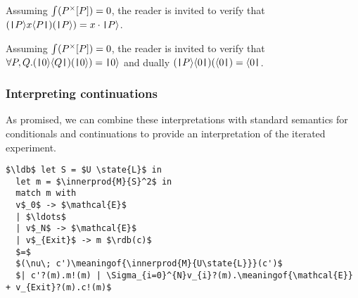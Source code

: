 \begin{remark}
  Assuming $\int (P^{\times}[P]) = 0$, the reader is
  invited to verify that $(\mathsf{\texttt{|}} P \rangle x \langle P \mathsf{\texttt{|}})(\mathsf{\texttt{|}} P \rangle) = x \cdot \mathsf{\texttt{|}} P \rangle$.
\end{remark}




  



\begin{remark}\label{rem:abstract_scalars}
  Assuming $\int (P^{\times}[P]) = 0$, the reader is
  invited to verify that $\forall P,Q. (\mathsf{\texttt{|}} 0 \rangle \langle Q \mathsf{\texttt{|}})(\mathsf{\texttt{|}} 0 \rangle) =
  \mathsf{\texttt{|}} 0 \rangle$ and dually $(\mathsf{\texttt{|}} P \rangle \langle 0 \mathsf{\texttt{|}})(\langle 0 \mathsf{\texttt{|}}) = \langle 0 \mathsf{\texttt{|}}$.
\end{remark}

\subsubsection{Interpreting continuations}

As promised, we can combine these interpretations with standard
semantics for conditionals and continuations to provide an
interpretation of the iterated experiment.

\begin{lstlisting}[mathescape]      
  $\ldb$ let S = $U \state{L}$ in 
  let m = $\innerprod{M}{S}^2$ in 
  match m with 
  v$_0$ -> $\mathcal{E}$
  | $\ldots$
  | v$_N$ -> $\mathcal{E}$
  | v$_{Exit}$ -> m $\rdb(c)$
  $=$
  $(\nu\; c')\meaningof{\innerprod{M}{U\state{L}}}(c')$
  $| c'?(m).m!(m) | \Sigma_{i=0}^{N}v_{i}?(m).\meaningof{\mathcal{E}} + v_{Exit}?(m).c!(m)$
\end{lstlisting}

